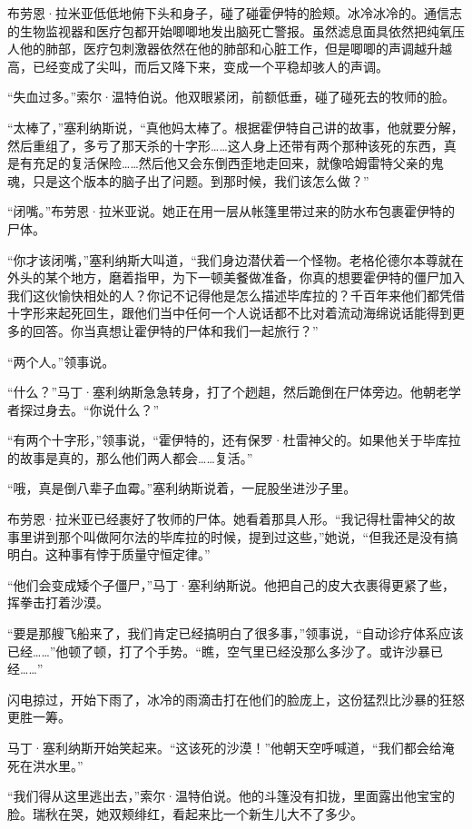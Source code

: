 \documentclass[AutoFakeBold=true]{book}
\begin{document}
布劳恩·拉米亚低低地俯下头和身子，碰了碰霍伊特的脸颊。冰冷冰冷的。通信志的生物监视器和医疗包都开始唧唧地发出脑死亡警报。虽然滤息面具依然把纯氧压人他的肺部，医疗包刺激器依然在他的肺部和心脏工作，但是唧唧的声调越升越高，已经变成了尖叫，而后又降下来，变成一个平稳却骇人的声调。

``失血过多。''索尔·温特伯说。他双眼紧闭，前额低垂，碰了碰死去的牧师的脸。

``太棒了，''塞利纳斯说，``真他妈太棒了。根据霍伊特自己讲的故事，他就要分解，然后重组了，多亏了那天杀的十字形……这人身上还带有{\kaishu 两个}那种该死的东西，真是有充足的复活保险……然后他又会东倒西歪地走回来，就像哈姆雷特父亲的鬼魂，只是这个版本的脑子出了问题。到那时候，我们该怎么做？''

``闭嘴。''布劳恩·拉米亚说。她正在用一层从帐篷里带过来的防水布包裹霍伊特的尸体。

``你才该闭嘴，''塞利纳斯大叫道，``我们身边潜伏着一个怪物。老格伦德尔本尊就在外头的某个地方，磨着指甲，为下一顿美餐做准备，你真的想要霍伊特的僵尸加入我们这伙愉快相处的人？你记不记得他是怎么描述毕库拉的？千百年来他们都凭借十字形来{\kaishu 起死回生}，跟他们当中任何一个人说话都不比对着流动海绵说话能得到更多的回答。你{\kaishu 当真}想让霍伊特的尸体和我们一起旅行？''

``两个人。''领事说。

``什么？''马丁·塞利纳斯急急转身，打了个趔趄，然后跪倒在尸体旁边。他朝老学者探过身去。``你说什么？''

``有两个十字形，''领事说，``霍伊特的，还有保罗·杜雷神父的。如果他关于毕库拉的故事是真的，那么他们两人都会……复活。''

``哦，真是倒八辈子血霉。''塞利纳斯说着，一屁股坐进沙子里。

布劳恩·拉米亚已经裹好了牧师的尸体。她看着那具人形。``我记得杜雷神父的故事里讲到那个叫做阿尔法的毕库拉的时候，提到过这些，''她说，``但我还是没有搞明白。这种事有悖于质量守恒定律。''

``他们会变成{\kaishu 矮个子}僵尸，''马丁·塞利纳斯说。他把自己的皮大衣裹得更紧了些，挥拳击打着沙漠。

``要是那艘飞船来了，我们肯定已经搞明白了很多事，''领事说，``自动诊疗体系应该已经……''他顿了顿，打了个手势。``瞧，空气里已经没那么多沙了。或许沙暴已经……''

闪电掠过，开始下雨了，冰冷的雨滴击打在他们的脸庞上，这份猛烈比沙暴的狂怒更胜一筹。

马丁·塞利纳斯开始笑起来。``这该死的{\kaishu 沙漠}！''他朝天空呼喊道，``我们都会给淹死在洪水里。''

``我们得从这里逃出去，''索尔·温特伯说。他的斗篷没有扣拢，里面露出他宝宝的脸。瑞秋在哭，她双颊绯红，看起来比一个新生儿大不了多少。
\end{document}
